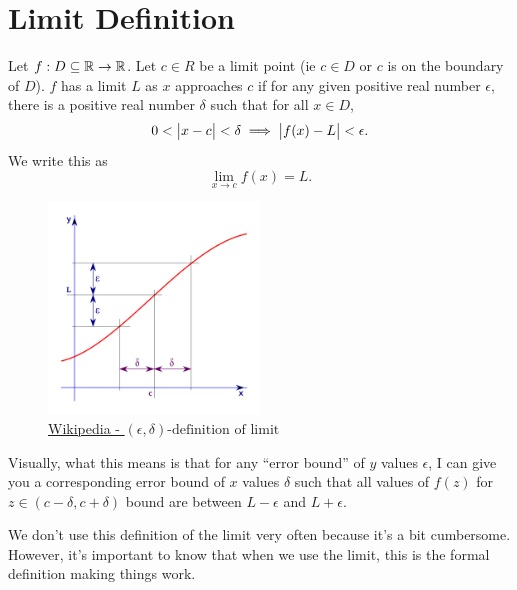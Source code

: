 \section{Limit Definition}
\begin{definition}
	Let $f : D \subseteq \mathbb{R} \to \mathbb{R}$.
	Let $c \in R$ be a limit point (ie $c \in D$ or $c$ is on the boundary of $D$).
	$f$ has a limit $L$ as $x$ approaches $c$ if for any given positive real number $\epsilon$, there is a positive real number $\delta$ such that for all $x \in D$,
	\begin{equation}
		0 < \big\lvert x-c \big\rvert < \delta \implies \big\lvert f(x) - L \big\rvert < \epsilon.
	\end{equation}
	We write this as
	\begin{equation*}
		\lim_{x \to c}{f(x)} = L.
	\end{equation*}
\end{definition}

\begin{figure}[H]
	\label{epsilon_delta}
	\centering
	\includegraphics[width = 0.5\textwidth]{./limits_continuity/limit_epsilon_delta.png}
	\caption{\hyperref{https://en.wikipedia.org/wiki/(\%CE\%B5,\_\%CE\%B4)-definition\_of\_limit}{}{}{Wikipedia - $(\epsilon, \delta)\text{-definition of limit}$}}
\end{figure}

Visually, what this means is that for any ``error bound'' of $y$ values $\epsilon$, I can give you a corresponding error bound of $x$ values $\delta$ such that all values of $f(z)$ for $z \in (c -\delta, c+ \delta)$ bound are between $L - \epsilon$ and $L + \epsilon$.


We don't use this definition of the limit very often because it's a bit cumbersome.
However, it's important to know that when we use the limit, this is the formal definition making things work.

